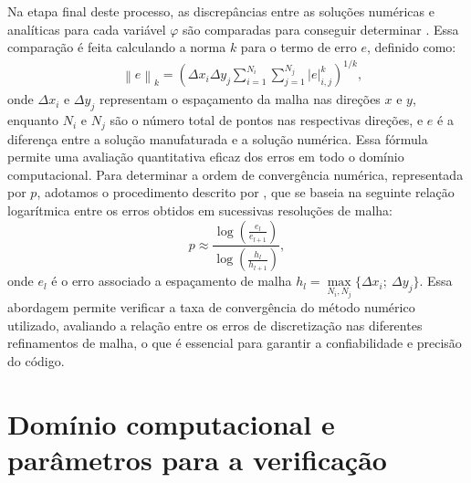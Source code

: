 Na etapa final deste processo, as discrepâncias entre as soluções numéricas e analíticas para cada variável $\varphi$ são comparadas para conseguir determinar . Essa comparação é feita calculando a norma $k$ para o termo de erro $e$, definido como:
\begin{align}
    &\left \|e\right \|_{k}=\left(\Delta x_{i} \Delta y_{j} \sum_{i=1}^{N_{i}}\sum_{j=1}^{N_{j}} \left |e\right |_{i,j}^{k}\right)^{1/k}, \label{norm_k}
\end{align}
onde $\Delta x_{i}$ e $\Delta y_{j}$ representam o espaçamento da malha nas direções $x$ e $y$, enquanto $N_{i}$ e $N_{j}$ são o número total de pontos nas respectivas direções, e $e$ é a diferença entre a solução manufaturada e a solução numérica. Essa fórmula permite uma avaliação quantitativa eficaz dos erros em todo o domínio computacional. Para determinar a ordem de convergência numérica, representada por $p$, adotamos o procedimento descrito por , que se baseia na seguinte relação logarítmica entre os erros obtidos em sucessivas resoluções de malha:
\begin{equation}\label{log_p} 
    p \approx \frac{\log\left(\frac{e_{l}}{e_{l+1}}\right)}{\log\left(\frac{h_{l}}{h_{l+1}}\right)},
\end{equation}
onde $e_{l}$ é o erro associado a espaçamento de malha $h_{l} = \max\limits_{N_i,N_j}\{\Delta x_{i};\ \Delta y_{j}\}.$ Essa abordagem permite verificar a taxa de convergência do método numérico utilizado, avaliando a relação entre os erros de discretização nas diferentes refinamentos de malha, o que é essencial para garantir a confiabilidade e precisão do código.

\section{Domínio computacional e parâmetros para a verificação}

